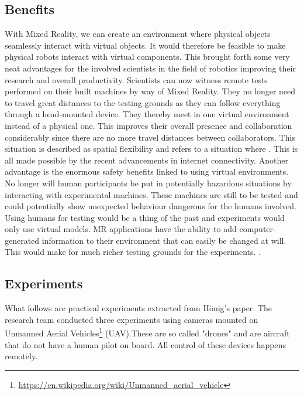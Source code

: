 \subsection{Benefits}
With Mixed Reality, we can create an environment where physical objects seamlessly interact with virtual objects. It would therefore be feasible to make physical robots interact with virtual components. This brought forth some very neat advantages for the involved scientists in the field of robotics improving their research and overall productivity.
\newline 
Scientists can now witness remote tests performed on their built machines by way of Mixed Reality. They no longer need to travel great distances to the testing grounds as they can follow everything through a head-mounted device. They thereby meet in one virtual environment instead of a physical one. This improves their overall presence and collaboration considerably since there are no more travel distances between collaborators. This situation is described as spatial flexibility\cite{hoenig2015mixed} and refers to a situation where . This is all made possible by the recent advancements in internet connectivity.
\newline
Another advantage is the enormous safety benefits linked to using virtual environments. No longer will human participants be put in potentially hazardous situations by interacting with experimental machines. These machines are still to be tested and could potentially show unexpected behaviour dangerous for the humans involved. Using humans for testing would be a thing of the past and experiments would only use virtual models.
\newline
MR applications have the ability to add computer-generated information to their environment that can easily be changed at will. This would make for much richer testing grounds for the experiments. . 

\subsection{Experiments}
What follows are practical experiments extracted from H\"{o}nig's paper\cite{hoenig2015mixed}. The research team conducted three experiments using cameras mounted on Unmanned Aerial Vehicles\footnote{\protect\url{https://en.wikipedia.org/wiki/Unmanned\_aerial\_vehicle}} (UAV).These are so called "drones" and are aircraft that do not have a human pilot on board. All control of these devices happens remotely.

